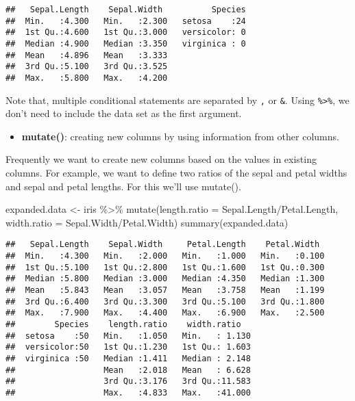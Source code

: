 \documentclass[
]{article}
\newenvironment{Shaded}{\begin{snugshade}}{\end{snugshade}}
\newcommand{\AttributeTok}[1]{\textcolor[rgb]{0.77,0.63,0.00}{#1}}
\newcommand{\FunctionTok}[1]{\textcolor[rgb]{0.00,0.00,0.00}{#1}}
\newcommand{\NormalTok}[1]{#1}
\newcommand{\OtherTok}[1]{\textcolor[rgb]{0.56,0.35,0.01}{#1}}
\newcommand{\SpecialCharTok}[1]{\textcolor[rgb]{0.00,0.00,0.00}{#1}}
\providecommand{\tightlist}{%
  \setlength{\itemsep}{0pt}\setlength{\parskip}{0pt}}
\begin{document}
\begin{verbatim}
##   Sepal.Length    Sepal.Width          Species  
##  Min.   :4.300   Min.   :2.300   setosa    :24  
##  1st Qu.:4.600   1st Qu.:3.000   versicolor: 0  
##  Median :4.900   Median :3.350   virginica : 0  
##  Mean   :4.896   Mean   :3.333                  
##  3rd Qu.:5.100   3rd Qu.:3.525                  
##  Max.   :5.800   Max.   :4.200
\end{verbatim}

Note that, multiple conditional statements are separated by \texttt{,}
or \texttt{\&}. Using \texttt{\%\textgreater{}\%}, we don't need to
include the data set as the first argument.

\begin{itemize}
\tightlist
\item
  \textbf{mutate()}: creating new columns by using information from
  other columns.
\end{itemize}

Frequently we want to create new columns based on the values in existing
columns. For example, we want to define two ratios of the sepal and
petal widths and sepal and petal lengths. For this we'll use mutate().

\begin{Shaded}
\begin{Highlighting}[]
\NormalTok{expanded.data }\OtherTok{\textless{}{-}}\NormalTok{ iris }\SpecialCharTok{\%\textgreater{}\%}
             \FunctionTok{mutate}\NormalTok{(}\AttributeTok{length.ratio =}\NormalTok{ Sepal.Length}\SpecialCharTok{/}\NormalTok{Petal.Length,}
                    \AttributeTok{width.ratio =}\NormalTok{ Sepal.Width}\SpecialCharTok{/}\NormalTok{Petal.Width)}
\FunctionTok{summary}\NormalTok{(expanded.data)}
\end{Highlighting}
\end{Shaded}

\begin{verbatim}
##   Sepal.Length    Sepal.Width     Petal.Length    Petal.Width   
##  Min.   :4.300   Min.   :2.000   Min.   :1.000   Min.   :0.100  
##  1st Qu.:5.100   1st Qu.:2.800   1st Qu.:1.600   1st Qu.:0.300  
##  Median :5.800   Median :3.000   Median :4.350   Median :1.300  
##  Mean   :5.843   Mean   :3.057   Mean   :3.758   Mean   :1.199  
##  3rd Qu.:6.400   3rd Qu.:3.300   3rd Qu.:5.100   3rd Qu.:1.800  
##  Max.   :7.900   Max.   :4.400   Max.   :6.900   Max.   :2.500  
##        Species    length.ratio    width.ratio    
##  setosa    :50   Min.   :1.050   Min.   : 1.130  
##  versicolor:50   1st Qu.:1.230   1st Qu.: 1.603  
##  virginica :50   Median :1.411   Median : 2.148  
##                  Mean   :2.018   Mean   : 6.628  
##                  3rd Qu.:3.176   3rd Qu.:11.583  
##                  Max.   :4.833   Max.   :41.000
\end{verbatim}
\end{document}
